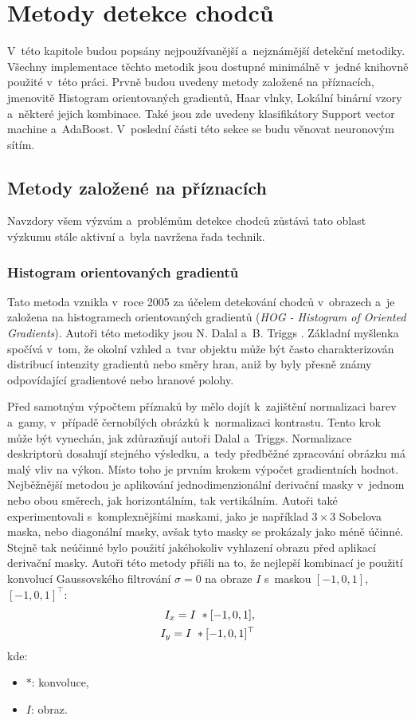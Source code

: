 \section{Metody detekce chodců}
V~této kapitole budou popsány nejpoužívanější a~nejznámější detekční metodiky. Všechny implementace těchto metodik jsou dostupné minimálně v~jedné knihovně použité v~této práci. Prvně budou uvedeny metody založené na příznacích, jmenovitě Histogram orientovaných gradientů, Haar vlnky, Lokální binární vzory a~některé jejich kombinace. Také jsou zde uvedeny klasifikátory Support vector machine a~AdaBoost. V~poslední části této sekce se budu věnovat neuronovým sítím. 

\subsection{Metody založené na příznacích}
Navzdory všem výzvám a~problémům detekce chodců zůstává tato oblast výzkumu stále aktivní a~byla navržena řada technik.
\subsubsection*{Histogram orientovaných gradientů}
Tato metoda vznikla v~roce 2005 za účelem detekování chodců v~obrazech a~je založena na histogramech orientovaných gradientů (\textit{HOG - Histogram of Oriented Gradients}). Autoři této metodiky jsou N. Dalal a~B. Triggs \cite{hog:dalal}. Základní myšlenka spočívá v~tom, že okolní vzhled a~tvar objektu může být často charakterizován distribucí intenzity gradientů nebo směry hran, aniž by byly přesně známy odpovídající gradientové nebo hranové polohy.  

Před samotným výpočtem příznaků by mělo dojít k~zajištění normalizaci barev a~gamy, v~případě černobílých obrázků k~normalizaci kontrastu. Tento krok může být vynechán, jak zdůrazňují autoři Dalal a~Triggs. Normalizace deskriptorů dosahují stejného výsledku, a~tedy předběžné zpracování obrázku má malý vliv na výkon. Místo toho je prvním krokem výpočet gradientních hodnot. Nejběžnější metodou je aplikování jednodimenzionální derivační masky v~jednom nebo obou směrech, jak horizontálním, tak vertikálním. Autoři také experimentovali s~komplexnějšími maskami, jako je například $3\times3$ Sobelova maska, nebo diagonální masky, avšak tyto masky se prokázaly jako méně účinné. Stejně tak neúčinné bylo použití jakéhokoliv vyhlazení obrazu před aplikací derivační masky. Autoři této metody přišli na to, že nejlepší kombinací je použití konvolucí Gaussovského filtrování $\sigma = 0$ na obraze $I$ s~maskou $[-1, 0, 1]$, $[-1,0,1]^\top$:
\begin{equation*}
\centering
 \label{eq:hogMask}
 \begin{aligned}
I_x = I~* [-1, 0, 1], \\
I_y = I~* [-1, 0, 1]^\top
 \end{aligned}
\end{equation*}
kde:
\begin{itemize}[label=]
  \item $*$: konvoluce,
  \item $I$: obraz.
\end{itemize}

